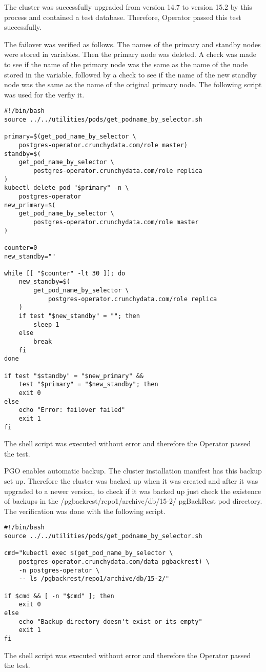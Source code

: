 The cluster was successfully upgraded from version 14.7 to version 15.2 by this process and contained a test database. Therefore, Operator passed this test successfully.

The failover was verified as follows. The names of the primary and standby nodes were stored in variables. Then the primary node was deleted. A check was made to see if the name of the primary node was the same as the name of the node stored in the variable, followed by a check to see if the name of the new standby node was the same as the name of the original primary node. The following script was used for the verfiy it.

\begin{verbatim}
#!/bin/bash
source ../../utilities/pods/get_podname_by_selector.sh

primary=$(get_pod_name_by_selector \
    postgres-operator.crunchydata.com/role master)
standby=$(
    get_pod_name_by_selector \
        postgres-operator.crunchydata.com/role replica
)
kubectl delete pod "$primary" -n \
    postgres-operator
new_primary=$(
    get_pod_name_by_selector \
        postgres-operator.crunchydata.com/role master
)

counter=0
new_standby=""

while [[ "$counter" -lt 30 ]]; do
    new_standby=$(
        get_pod_name_by_selector \
            postgres-operator.crunchydata.com/role replica
    )
    if test "$new_standby" = ""; then
        sleep 1
    else
        break
    fi
done

if test "$standby" = "$new_primary" &&
    test "$primary" = "$new_standby"; then
    exit 0
else
    echo "Error: failover failed"
    exit 1
fi
\end{verbatim}

The shell script was executed without error and therefore the Operator passed the test.


PGO enables automatic backup. The cluster installation manifest has this backup set up. Therefore the cluster was backed up when it was created and after it was upgraded to a newer version, to check if it was backed up just check the existence of backups in the /pgbackrest/repo1/archive/db/15-2/ pgBackRest pod directory. The verification was done with the following script.

\begin{verbatim}
#!/bin/bash
source ../../utilities/pods/get_podname_by_selector.sh

cmd="kubectl exec $(get_pod_name_by_selector \
    postgres-operator.crunchydata.com/data pgbackrest) \
    -n postgres-operator \
    -- ls /pgbackrest/repo1/archive/db/15-2/"

if $cmd && [ -n "$cmd" ]; then
    exit 0
else
    echo "Backup directory doesn't exist or its empty"
    exit 1
fi
\end{verbatim}
The shell script was executed without error and therefore the Operator passed the test.

